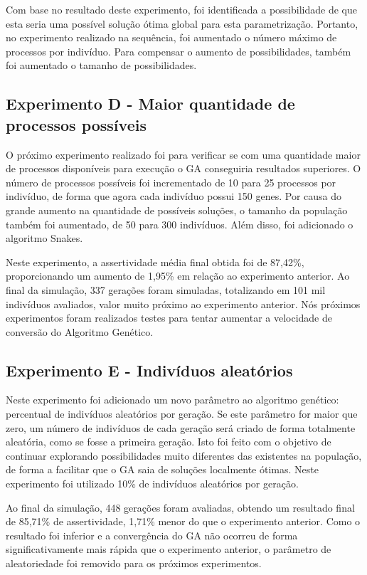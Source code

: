 \documentclass[12pt,oneside,a4paper,english,french,spanish,brazil,]{abntex2}
\begin{document}
Com base no resultado deste experimento, foi identificada a possibilidade de que esta seria uma possível solução ótima global para esta parametrização. Portanto, no experimento realizado na sequência, foi aumentado o número máximo de processos por indivíduo. Para compensar o aumento de possibilidades, também foi aumentado o tamanho de possibilidades.

\subsection{Experimento D - Maior quantidade de processos possíveis}

O próximo experimento realizado foi para verificar se com uma quantidade maior de processos disponíveis para execução o GA conseguiria resultados superiores. O número de processos possíveis foi incrementado de 10 para 25 processos por indivíduo, de forma que agora cada indivíduo possui 150 genes. Por causa do grande aumento na quantidade de possíveis soluções, o tamanho da população também foi aumentado, de 50 para 300 indivíduos. Além disso, foi adicionado o algoritmo Snakes.

Neste experimento, a assertividade média final obtida foi de 87,42\%, proporcionando um aumento de 1,95\% em relação ao experimento anterior. Ao final da simulação, 337 gerações foram simuladas, totalizando em 101 mil indivíduos avaliados, valor muito próximo ao experimento anterior. Nós próximos experimentos foram realizados testes para tentar aumentar a velocidade de conversão do Algoritmo Genético.

\subsection{Experimento E - Indivíduos aleatórios}

Neste experimento foi adicionado um novo parâmetro ao algoritmo genético: percentual de indivíduos aleatórios por geração. Se este parâmetro for maior que zero, um número de indivíduos de cada geração será criado de forma totalmente aleatória, como se fosse a primeira geração. Isto foi feito com o objetivo de continuar explorando possibilidades muito diferentes das existentes na população, de forma a facilitar que o GA saia de soluções localmente ótimas. Neste experimento foi utilizado 10\% de indivíduos aleatórios por geração.

Ao final da simulação, 448 gerações foram avaliadas, obtendo um resultado final de 85,71\% de assertividade, 1,71\% menor do que o experimento anterior. Como o resultado foi inferior e a convergência do GA não ocorreu de forma significativamente mais rápida que o experimento anterior, o parâmetro de aleatoriedade foi removido para os próximos experimentos.
\end{document}
